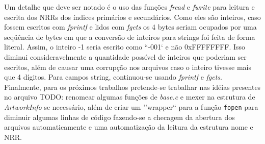\documentclass{article}
\begin{document}
Um detalhe que deve ser notado é o uso das funções \textit{fread} e \textit{fwrite} para leitura e escrita dos NRRs dos índices primários e secundários. Como eles são inteiros, caso fossem escritos com \textit{fprintf} e lidos com \textit{fgets} os 4 bytes seriam ocupados por uma seqüência de bytes em que a conversão de inteiros para strings foi feita de forma literal. Assim, o inteiro -1 seria escrito como ``-001` e não 0xFFFFFFFF. Isso diminui consideravelmente a quantidade possível de inteiros que poderiam ser escritos, além de causar uma corrupção nos arquivos caso o inteiro tivesse mais que 4 dígitos. Para campos string, continuou-se usando \textit{fprintf} e \textit{fgets}.\\

Finalmente, para os próximos trabalhos pretende-se trabalhar nas idéias presentes no arquivo TODO: renomear algumas funções de \textit{base.c} e mexer na estrutura de \textit{ArtworkInfo} se necessário, além de criar um ''wrapper`` para a função \texttt{fopen} para diminuir algumas linhas de código fazendo-se a checagem da abertura dos arquivos automaticamente e uma automatização da leitura da estrutura nome e NRR.
\end{document}
